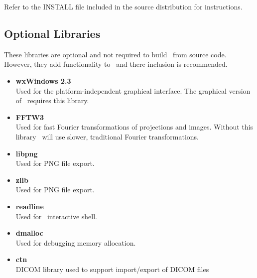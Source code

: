 Refer to the INSTALL file included in the source distribution for
instructions.

\subsection{Optional Libraries}
These libraries are optional and not required to build \ctsim\ from source code.
However, they add functionality to \ctsim\ and there inclusion is recommended.

  \begin{itemize}
  \item \textbf{wxWindows 2.3}\\
  Used for the platform-independent graphical interface. The graphical version
  of \ctsim\ requires this library.\\

  \item \textbf{FFTW3}\\
    Used for fast Fourier transformations of projections and images.
    Without this library \ctsim\ will use slower, traditional Fourier transformations.\\

  \item \textbf{libpng}\\
        Used for PNG file export.\\

  \item \textbf{zlib}\\
        Used for PNG file export.\\

  \item \textbf{readline}\\
    Used for \ctsimtext\ interactive shell.\\

  \item \textbf{dmalloc}\\
    Used for debugging memory allocation.\\

  \item \textbf{ctn}\\
    DICOM library used to support import/export of DICOM files

\end{itemize}
